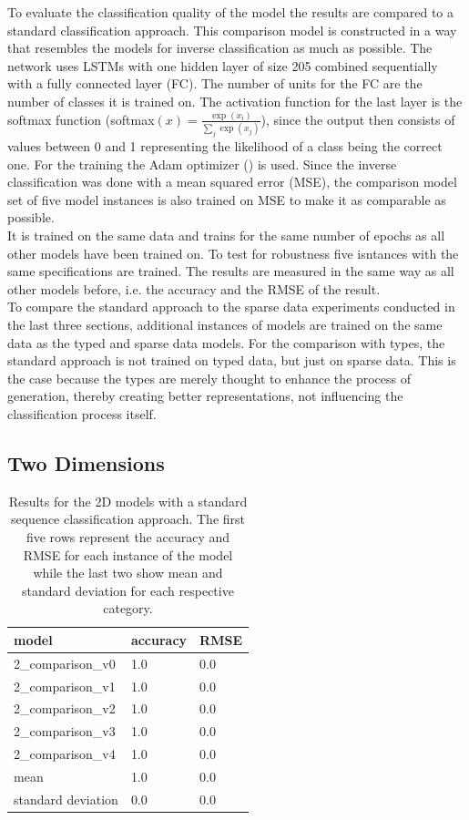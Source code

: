 To evaluate the classification quality of the model the results are compared to a standard classification approach. This comparison model is constructed in a way that resembles the models for inverse classification as much as possible. The network uses LSTMs with one hidden layer of size 205 combined sequentially with a fully connected layer (FC). The number of units for the FC are the number of classes it is trained on. The activation function for the last layer is the softmax function (softmax$(x) = \frac{\exp(x_i)}{\sum_j \exp(x_j)}$), since the output then consists of values between 0 and 1 representing the likelihood of a class being the correct one. 
For the training the Adam optimizer (\cite{AdamKingmaB14}) is used.
Since the inverse classification was done with a mean squared error (MSE), the comparison model set of five model instances is also trained on MSE to make it as comparable as possible.\\
It is trained on the same data and trains for the same number of epochs as all other models have been trained on. To test for robustness five isntances with the same specifications are trained. The results are measured in the same way as all other models before, i.e. the accuracy and the RMSE of the result. \\
To compare the standard approach to the sparse data experiments conducted in the last three sections, additional instances of models are trained on the same data as the typed and sparse data models. For the comparison with types, the standard approach is not trained on typed data, but just on sparse data. This is the case because the types are merely thought to enhance the process of generation, thereby creating better representations, not influencing the classification process itself. 

\subsection{Two Dimensions}


\begin{table}[!htb]
	\centering
	\caption{Results for the 2D models with a standard sequence classification approach. The first five rows represent the accuracy and RMSE for each instance of the model while the last two show mean and standard deviation for each respective category.}
	\begin{tabularx}{\textwidth}{ X  X  X }
		\hline
		model & accuracy & RMSE \\ 
		\hline
		2\_comparison\_v0 & 1.0 & 0.0 \\ 
		2\_comparison\_v1 & 1.0 & 0.0 \\
		2\_comparison\_v2 & 1.0 & 0.0 \\ 
		2\_comparison\_v3 & 1.0 & 0.0 \\ 
		2\_comparison\_v4 & 1.0 & 0.0  \\ \hline
		mean & 1.0 & 0.0\\
		standard deviation & 0.0 & 0.0 \\
		\hline
	\end{tabularx}
	\label{table:2_comparison_mse}
\end{table}



